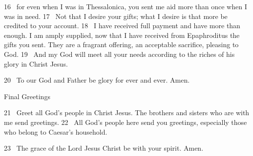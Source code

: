 16 
for even when I was in Thessalonica,
you sent me aid more than once when I was in need.
17 
Not that I desire your gifts; what I desire is that more be credited to your account.
18 
I have received full payment and have more than enough. I am amply supplied, now that I have received from Epaphroditus
the gifts you sent. They are a fragrant
offering, an acceptable sacrifice, pleasing to God.
19 
And my God will meet all your needs
according to the riches of his glory
in Christ Jesus.
\par
20 
To our God and Father
be glory for ever and ever. Amen.
\par
Final Greetings
\par
21 
Greet all God’s people in Christ Jesus. The brothers and sisters who are with me
send greetings.
22 
All God’s people
here send you greetings, especially those who belong to Caesar’s household.
\par
23 
The grace of the Lord Jesus Christ
be with your spirit.
Amen.


\bye

